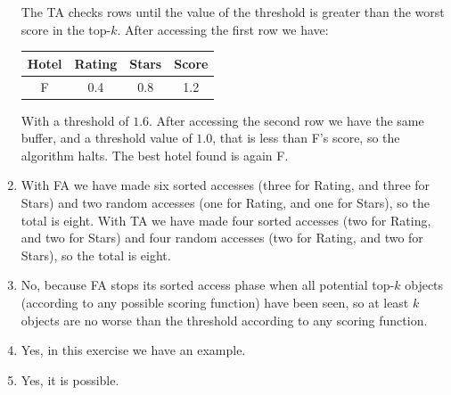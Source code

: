 \documentclass[12pt, a4paper]{report}
\begin{document}
\begin{enumerate}
                The TA checks rows until the value of the threshold is greater than the worst score in the top-$k$. After accessing the first row 
                we have:
                \begin{table}[H]
                    \centering
                    \begin{tabular}{c|cc|c}
                    \hline
                    \textbf{Hotel} & \textbf{Rating} & \textbf{Stars} & \textbf{Score} \\ \hline
                    F     & 0.4    & 0.8   & 1.2   \\ \hline
                    \end{tabular}
                \end{table}
                With a threshold of $1.6$. After accessing the second row we have the same buffer, and a threshold value of $1.0$, that is less than F's score, so 
                the algorithm halts. The best hotel found is again F. 
            \item With FA we have made six sorted accesses (three for Rating, and three for Stars) and two random accesses (one for Rating, and one for Stars), so the total is eight. 
                With TA we have made four sorted accesses (two for Rating, and two for Stars) and four random accesses (two for Rating, and two for Stars), so the total is eight. 
            \item No, because FA stops its sorted access phase when all potential top-$k$ objects (according to any possible scoring function) have been seen, so at least $k$ objects 
                are no worse than the threshold according to any scoring function. 
            \item Yes, in this exercise we have an example. 
            \item Yes, it is possible. 
        \end{enumerate}
    
    \newpage 
\end{document}
